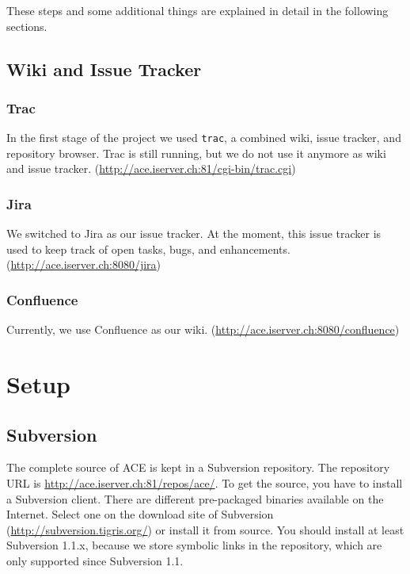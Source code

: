 \documentclass[11pt,a4paper]{article}
\begin{document}
These steps and some additional things are explained in detail in the
following sections.


\subsection{Wiki and Issue Tracker}

\subsubsection{Trac}
In the first stage of the project we used \texttt{trac}, a combined wiki, issue tracker, and repository browser. Trac is still running, but we do not use it anymore as wiki and issue tracker. (\href{http://ace.iserver.ch:81/cgi-bin/trac.cgi}{http://ace.iserver.ch:81/cgi-bin/trac.cgi})

\subsubsection{Jira}
We switched to Jira as our issue tracker. At the moment, this issue tracker is used to keep track of open tasks, bugs, and enhancements. 
(\href{http://ace.iserver.ch:8080/jira}{http://ace.iserver.ch:8080/jira})

\subsubsection{Confluence}
Currently, we use Confluence as our wiki. (\href{http://ace.iserver.ch:8080/confluence}{http://ace.iserver.ch:8080/confluence})



\section{Setup}


\subsection{Subversion}
The complete source of ACE is kept in a Subversion repository. The repository
URL is \href{http://ace.iserver.ch:81/repos/ace/}{http://ace.iserver.ch:81/repos/ace/}. To get the source, you have to install a Subversion client.
There are different pre-packaged binaries available on the Internet.
Select one on the download site of Subversion
(\href{http://subversion.tigris.org/}{http://subversion.tigris.org/})
or install it from source. You should install at least Subversion 1.1.x,
because we store symbolic links in the repository, which are only supported
since Subversion 1.1.
\end{document}
